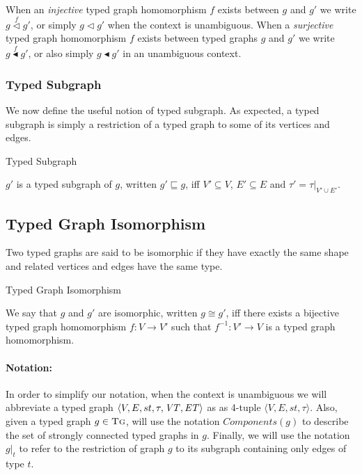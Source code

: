  When an \emph{injective} typed graph homomorphism $f$ exists between $g$ and $g'$ we write $g \stackrel{f}{\vartriangleleft} g'$, or simply $g \vartriangleleft g'$ when the context is unambiguous. When a \emph{surjective} typed graph homomorphism $f$ exists between typed graphs $g$ and $g'$ we write $g \stackrel{f}{\blacktriangleleft} g'$, or also simply $g \blacktriangleleft g'$ in an unambiguous context. 


\subsubsection*{Typed Subgraph}
We now define the useful notion of typed subgraph. As expected, a typed subgraph is simply a restriction of a typed graph to some of its vertices and edges. 

\begin{definition}{Typed Subgraph\\}
\label{def:typedsubgraph}

$g'$ is a typed subgraph of $g$, written $g'\sqsubseteq g$, iff $V'\subseteq V$, $E'\subseteq E$ and $\tau'=\tau |_{V'\cup E'}$.

\end{definition} 


\subsection*{Typed Graph Isomorphism}
Two typed graphs are said to be isomorphic if they have exactly the same shape and related vertices and edges have the same type.


\begin{definition}{Typed Graph Isomorphism\\}
\label{def:typed_graph_isomorphism}

We say that $g$ and $g'$ are isomorphic, written $g\cong g'$, iff there exists a bijective typed graph homomorphism $f:V\rightarrow V'$ such that $f^{-1}:V'\rightarrow V$ is a typed graph homomorphism.
\end{definition}

\paragraph{\textbf{Notation:}}
In order to simplify our notation, when the context is unambiguous we will abbreviate a typed graph $\langle V,E,st,\\\tau,\mathit{VT}, \mathit{ET}\rangle$ as as 4-tuple $\langle V,E,st,\tau\rangle$. Also, given a typed graph $g\in \textsc{Tg}$, will use the notation $Components(g)$ to describe the set of strongly connected typed graphs in $g$. Finally, we will use the notation $g|_{t}$ to refer to the restriction of graph $g$ to its subgraph containing only edges of type $t$.

